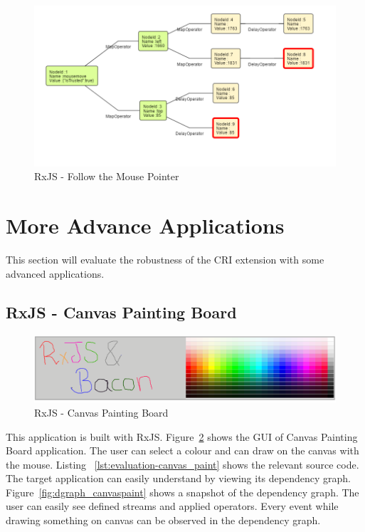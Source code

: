 \begin{figure}[!h]
	\centering
	\includegraphics[width=\textwidth,height=\textheight,keepaspectratio]{gfx/evaluation/dg_mouse_follow.png}
	\caption{RxJS - Follow the Mouse Pointer}
	\label{fig:dg_mouse_follow}
\end{figure}





\section{More Advance Applications}
This section will evaluate the robustness of the CRI extension with some advanced applications.

\subsection{RxJS - Canvas Painting Board}

\begin{figure}[!h]
	\centering
	\includegraphics[width=\textwidth,height=\textheight,keepaspectratio]{gfx/evaluation/canvas_paint_ui.png}
	\caption{RxJS - Canvas Painting Board}
	\label{fig:canvas_paint_ui}
\end{figure}

This application is built with RxJS. Figure~\ref{fig:canvas_paint_ui} shows the GUI of Canvas Painting Board application. The user can select a colour and can draw on the canvas with the mouse. Listing ~\ref{lst:evaluation-canvas_paint} shows the relevant source code. The target application can easily understand by viewing its dependency graph. Figure~\ref{fig:dgraph_canvaspaint} shows a snapshot of the dependency graph. The user can easily see defined streams and applied operators. Every event while drawing something on canvas can be observed in the dependency graph. 


